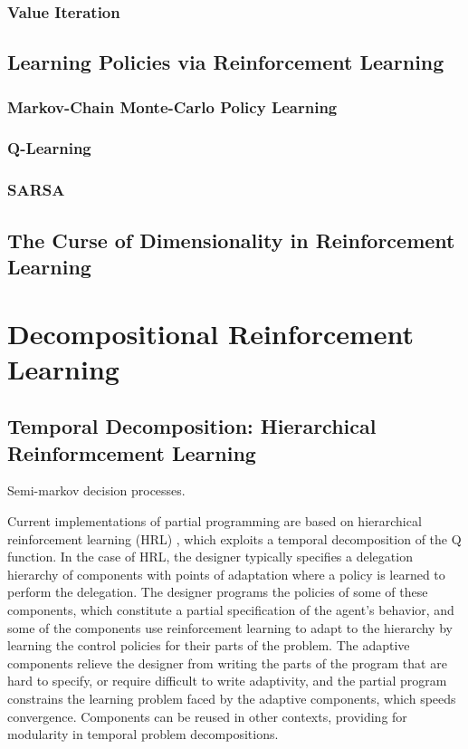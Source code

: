 \subsubsection{Value Iteration}

\subsection{Learning Policies via Reinforcement Learning}

\subsubsection{Markov-Chain Monte-Carlo Policy Learning}

\subsubsection{Q-Learning}

\subsubsection{SARSA}


\subsection{The Curse of Dimensionality in Reinforcement Learning}


\section{Decompositional Reinforcement Learning}



\subsection{Temporal Decomposition: Hierarchical Reinformcement Learning}

Semi-markov decision processes.

Current implementations of partial programming are based on hierarchical reinforcement learning (HRL) \cite{dietterich1998maxq,dietterich2000hierarchical,sutton1999between,parr1998reinforcement,andre2000programmable,andre2002state,marthi2005concurrent}, which exploits a temporal decomposition of the Q function.  In the case of HRL, the designer typically specifies a delegation hierarchy of components with points of adaptation where a policy is learned to perform the delegation.  The designer programs the policies of some of these components, which constitute a partial specification of the agent's behavior, and some of the components use reinforcement learning to adapt to the hierarchy by learning the control policies for their parts of the problem.  The adaptive components relieve the designer from writing the parts of the program that are hard to specify, or require difficult to write adaptivity, and the partial program constrains the learning problem faced by the adaptive components, which speeds convergence.  Components can be reused in other contexts, providing for modularity in temporal problem decompositions.

